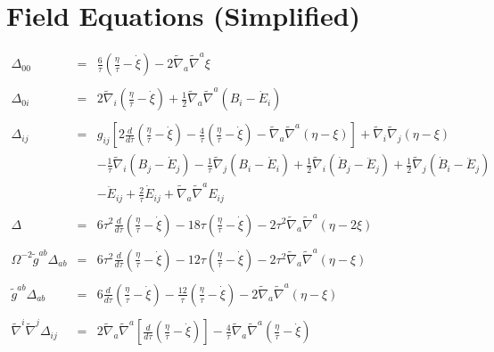 \documentclass[10pt,letterpaper]{article}
\numberwithin{equation}{section}
\begin{document}
\section{Field Equations (Simplified)}
\begin{eqnarray}
\Delta_{00} &=& \frac{6}{\tau}\left( \frac{\eta}{\tau} - \dot\xi\right) -2 \tilde\nabla_a\tilde\nabla^a\xi
\label{D00}
\\ \nonumber\\
\Delta_{0i} &=& 2\tilde\nabla_i \left( \frac{\eta}{\tau} - \dot\xi\right) 
+\tfrac{1}{2} \tilde\nabla_{a}\tilde\nabla^{a}(B_{i}-\dot E_{i})
\label{D0i}
\\ \nonumber\\
\Delta_{ij} &=& g_{ij} \left[ 2 \frac{d}{d\tau}\left( \frac{\eta}{\tau} - \dot\xi\right) - \frac{4}{\tau}\left( \frac{\eta}{\tau} - \dot\xi\right) - \tilde\nabla_a\tilde\nabla^a (\eta-\xi)\right]
+\tilde\nabla_i\tilde\nabla_j (\eta-\xi)  
\nonumber\\
&& - \frac{1}{\tau}\tilde\nabla_i (B_j-\dot E_j) - \frac{1}{\tau} \tilde\nabla_j (B_i-\dot E_i) + \frac12 \tilde\nabla_i (\dot B_j - \ddot E_j) + \frac12 \tilde\nabla_j (\dot B_i -\ddot E_j) 
\nonumber\\
&& - \ddot E_{ij} + \frac{2}{\tau} \dot E_{ij} + \tilde\nabla_a\tilde\nabla^a E_{ij} 
\\ \nonumber \\
\Delta &=&  
6\tau^2 \frac{d}{d\tau}\left( \frac{\eta}{\tau} - \dot\xi\right) - 18\tau \left( \frac{\eta}{\tau} - \dot\xi\right)
-2\tau^2 \tilde\nabla_a\tilde\nabla^a (\eta-2\xi) 
\\ \nonumber \\
\Omega^{-2}\tilde g^{ab}\Delta_{ab} &=&  
 6\tau^2 \frac{d}{d\tau}\left( \frac{\eta}{\tau} - \dot\xi\right) - 12\tau \left( \frac{\eta}{\tau} - \dot\xi\right)
-2\tau^2 \tilde\nabla_a\tilde\nabla^a (\eta-\xi) 
\\ \nonumber \\
\tilde g^{ab}\Delta_{ab} &=&  
6\frac{d}{d\tau}\left( \frac{\eta}{\tau} - \dot\xi\right) - \frac{12}{\tau} \left( \frac{\eta}{\tau} - \dot\xi\right)
-2 \tilde\nabla_a\tilde\nabla^a (\eta-\xi) 
\\ \nonumber \\
\tilde\nabla^i \tilde\nabla^j \Delta_{ij}&=& 2 \tilde\nabla_a\tilde\nabla^a \left[ \frac{d}{d\tau}\left(\frac{\eta}{\tau}-\dot\xi\right)\right] -\frac{4}{\tau} \tilde\nabla_a\tilde\nabla^a 
\left(\frac{\eta}{\tau} - \dot\xi\right)
\end{eqnarray}
%
%
%
\end{document}
